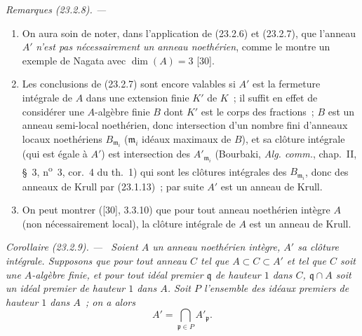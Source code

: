 \documentclass[10pt,oneside]{book}
\makeatletter
\newcommand{\setmanualcurrentlabel}[1]{\def\@currentlabel{#1}}
\newenvironment{corollary}[1][]{%
  \setmanualcurrentlabel{#1}\par\medskip\noindent\itshape Corollaire (#1). ---\ }{\par}
\newenvironment{remarks}[1][]{%
  \setmanualcurrentlabel{#1}\par\medskip\noindent\itshape Remarques (#1). ---\ }{\par}
\makeatother
\begin{document}
\begin{remarks}[23.2.8]
\label{0.23.2.8-fr}
\begin{enumerate}
  \item[(i)] On aura soin de noter, dans l'application de (23.2.6) et
  (23.2.7), que l'anneau $A'$ \emph{n'est pas nécessairement un anneau
  noethérien}, comme le montre un exemple de Nagata avec $\dim(A)=3$ [30].

  \item[(ii)] Les conclusions de (23.2.7) sont encore valables si $A'$ est
  la fermeture intégrale de $A$ dans une extension finie $K'$ de $K$~; il
  suffit en effet de considérer une $A$-algèbre finie $B$ dont $K'$ est le
  corps des fractions~; $B$ est un anneau semi-local noethérien, donc
  intersection d'un nombre fini d'anneaux locaux noethériens
  $B_{\mathfrak m_i}$ ($\mathfrak m_i$ idéaux maximaux de $B$), et sa clôture
  intégrale (qui est égale à $A'$) est intersection des
  $A'_{\mathfrak m_i}$ (Bourbaki, \emph{Alg. comm.}, chap.~II, §~3,
  n\textsuperscript{o}~3, cor.~4 du th.~1) qui sont les clôtures intégrales
  des $B_{\mathfrak m_i}$, donc des anneaux de Krull par (23.1.13)~; par
  suite $A'$ est un anneau de Krull.

  \item[(iii)] On peut montrer ([30], 3.3.10) que pour tout anneau noethérien
  intègre $A$ (non nécessairement local), la clôture intégrale de $A$ est un
  anneau de Krull.
\end{enumerate}
\end{remarks}

\begin{corollary}[23.2.9]
\label{0.23.2.9-fr}
Soient $A$ un anneau noethérien intègre, $A'$ sa clôture intégrale. Supposons
que pour tout anneau $C$ tel que $A\subset C\subset A'$ et tel que $C$ soit
une $A$-algèbre finie, et pour tout idéal premier $\mathfrak q$ de hauteur $1$
dans $C$, $\mathfrak q\cap A$ soit un idéal premier de hauteur $1$ dans $A$.
Soit $P$ l'ensemble des idéaux premiers de hauteur $1$ dans $A$~; on a alors
\[
  A'=\bigcap_{\mathfrak p\in P}A'_{\mathfrak p}.
\]
\end{corollary}
\end{document}
